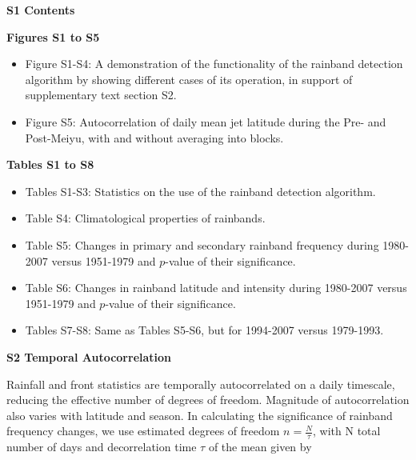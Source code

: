 \documentclass[draft,grl]{agutexSI}
\begin{document}
\begin{article}

%
%


\noindent\textbf{{\Large S1 Contents}}

\vspace{2mm}

\noindent\textbf{Figures S1 to S5}
\begin{itemize}
	\item Figure S1-S4: A demonstration of the functionality of the rainband detection algorithm by showing different cases of its operation, in support of supplementary text section S2.

	\item Figure S5: Autocorrelation of daily mean jet latitude during the Pre- and Post-Meiyu, with and without averaging into blocks.

\end{itemize}

\vspace{3mm}

\noindent\textbf{Tables S1 to S8}
\begin{itemize}
\item Tables S1-S3: Statistics on the use of the rainband detection algorithm.

\item Table S4: Climatological properties of rainbands. 

\item Table S5: Changes in primary and secondary rainband frequency during 1980-2007 versus 1951-1979 and $p$-value of their significance.

\item Table S6: Changes in rainband latitude and intensity during 1980-2007 versus 1951-1979 and $p$-value of their significance.

\item Tables S7-S8: Same as Tables S5-S6, but for 1994-2007 versus 1979-1993.
\end{itemize}

\vspace{5mm}

\noindent\textbf{{\Large S2 Temporal Autocorrelation}}

\vspace{2mm}

Rainfall and front statistics are temporally autocorrelated on a daily timescale, reducing the effective number of degrees of freedom. Magnitude of autocorrelation also varies with latitude and season. In calculating the significance of rainband frequency changes, we use estimated degrees of freedom $n=\frac{N}{\tau}$, with N total number of days and decorrelation time $\tau$ of the mean given by


\end{article}
\end{document}
